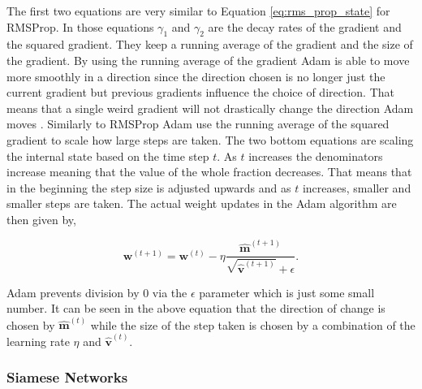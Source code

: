 \begin{description}
        The first two equations are very similar to Equation
        \eqref{eq:rms_prop_state} for \gls{RMSProp}. In those equations
        $\gamma_1$ and $\gamma_2$ are the decay rates of the gradient and the
        squared gradient. They keep a running average of the gradient and the
        size of the gradient. By using the running average of the gradient
        \gls{Adam} is able to move more smoothly in a direction since the
        direction chosen is no longer just the current gradient but previous
        gradients influence the choice of direction. That means that a single
        weird gradient will not drastically change the direction \gls{Adam}
        moves \citep{DBLP:journals/corr/KingmaB14}. Similarly to \gls{RMSProp}
        \gls{Adam} use the running average of the squared gradient to scale how
        large steps are taken. The two bottom equations are scaling the internal
        state based on the time step $t$. As $t$ increases the denominators
        increase meaning that the value of the whole fraction decreases. That
        means that in the beginning the step size is adjusted upwards and as
        $t$ increases, smaller and smaller steps are taken. The actual weight
        updates in the \gls{Adam} algorithm are then given by,

        \begin{equation}
            \mathbf{w}^{(t + 1)} = \mathbf{w}^{(t)} -
                \eta\frac
                    {\mathbf{\hat{m}}^{(t+1)}}
                    {\sqrt{\mathbf{\hat{v}}^{(t+1)}} + \epsilon}.
        \end{equation}

        \gls{Adam} prevents division by 0 via the $\epsilon$ parameter which is
        just some small number. It can be seen in the above equation that the
        direction of change is chosen by $\mathbf{\hat{m}}^{(t)}$ while the size
        of the step taken is chosen by a combination of the learning rate $\eta$
        and $\mathbf{\hat{v}}^{(t)}$.

\end{description}


\subsubsection{Siamese Networks}\label{subsubsec:siamese_networks}

